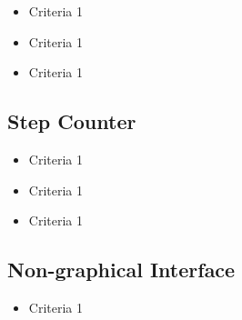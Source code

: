{ }
{\begin{itemize}
\item Criteria 1
\end{itemize}}

{ }
{\begin{itemize}
\item Criteria 1
\end{itemize}}

{ }
{\begin{itemize}
\item Criteria 1
\end{itemize}}



\subsection{Step Counter}
{ }
{\begin{itemize}
\item Criteria 1
\end{itemize}}

{ }
{\begin{itemize}
\item Criteria 1
\end{itemize}}

{ }
{\begin{itemize}
\item Criteria 1
\end{itemize}}



\subsection{Non-graphical Interface}
{ }
{\begin{itemize}
\item Criteria 1
\end{itemize}}